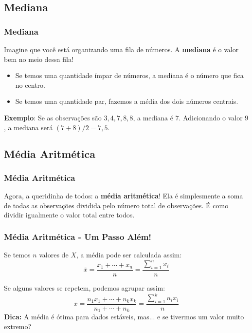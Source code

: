 \documentclass[14pt,aspectratio=1610]{beamer}
\newcommand{\bx}{\ensuremath{\bar{x}}}
\begin{document}
\subsection{Mediana}
\begin{frame}{}
	\frametitle{Mediana}
	\begin{block}{}
		\justifying
		Imagine que você está organizando uma fila de números. A \textbf{mediana} é o valor bem no meio dessa fila! 
		\begin{itemize}
			\item Se temos uma quantidade ímpar de números, a mediana é o número que fica no centro.
			\item Se temos uma quantidade par, fazemos a média dos dois números centrais.
		\end{itemize}
		
		\textbf{Exemplo}: Se as observações são $3, 4, 7, 8, 8$, a mediana é $7$. Adicionando o valor $9$, a mediana será $(7+8)/2 = 7,5$.
	\end{block}
\end{frame}

\subsection{Média Aritmética}
\begin{frame}{}
	\frametitle{Média Aritmética}
	\begin{block}{}
		\justifying
		Agora, a queridinha de todos: a \textbf{média aritmética}! Ela é simplesmente a soma de todas as observações dividida pelo número total de observações. É como dividir igualmente o valor total entre todos.
	\end{block}
\end{frame}

\begin{frame}{}
	\frametitle{Média Aritmética - Um Passo Além!}
	\vspace{-0.3cm}
	\begin{block}{}
		\justifying
		Se temos $n$ valores de $X$, a média pode ser calculada assim:
		\begin{equation}
			\bx=\dfrac{x_{1}+\cdots+x_{n}}{n}=\dfrac{\displaystyle \sum_{i=1}^{n}{x_{i}}}{n}
		\end{equation}
		
		Se alguns valores se repetem, podemos agrupar assim:
		\begin{equation}
			\bx=\dfrac{n_{1}x_{1}+\cdots+n_{k}x_{k}}{n_{1}+\cdots+n_{k}}=\dfrac{\displaystyle \sum_{i=1}^{k}n_{i}x_{i}}{n}
		\end{equation}
		\textbf{Dica:} A média é ótima para dados estáveis, mas... e se tivermos um valor muito extremo? 
	\end{block}
\end{frame}
\end{document}
